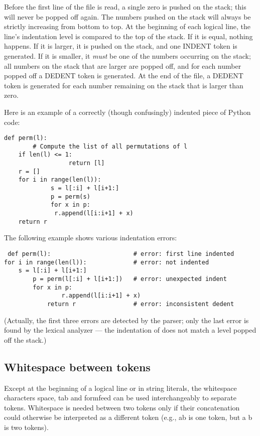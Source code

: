Before the first line of the file is read, a single zero is pushed on
the stack; this will never be popped off again.  The numbers pushed on
the stack will always be strictly increasing from bottom to top.  At
the beginning of each logical line, the line's indentation level is
compared to the top of the stack.  If it is equal, nothing happens.
If it is larger, it is pushed on the stack, and one INDENT token is
generated.  If it is smaller, it \emph{must} be one of the numbers
occurring on the stack; all numbers on the stack that are larger are
popped off, and for each number popped off a DEDENT token is
generated.  At the end of the file, a DEDENT token is generated for
each number remaining on the stack that is larger than zero.

Here is an example of a correctly (though confusingly) indented piece
of Python code:

\begin{verbatim}
def perm(l):
        # Compute the list of all permutations of l
    if len(l) <= 1:
                  return [l]
    r = []
    for i in range(len(l)):
             s = l[:i] + l[i+1:]
             p = perm(s)
             for x in p:
              r.append(l[i:i+1] + x)
    return r
\end{verbatim}

The following example shows various indentation errors:

\begin{verbatim}
 def perm(l):                       # error: first line indented
for i in range(len(l)):             # error: not indented
    s = l[:i] + l[i+1:]
        p = perm(l[:i] + l[i+1:])   # error: unexpected indent
        for x in p:
                r.append(l[i:i+1] + x)
            return r                # error: inconsistent dedent
\end{verbatim}

(Actually, the first three errors are detected by the parser; only the
last error is found by the lexical analyzer --- the indentation of
 does not match a level popped off the stack.)


\subsection{Whitespace between tokens\label{whitespace}}

Except at the beginning of a logical line or in string literals, the
whitespace characters space, tab and formfeed can be used
interchangeably to separate tokens.  Whitespace is needed between two
tokens only if their concatenation could otherwise be interpreted as a
different token (e.g., ab is one token, but a b is two tokens).


